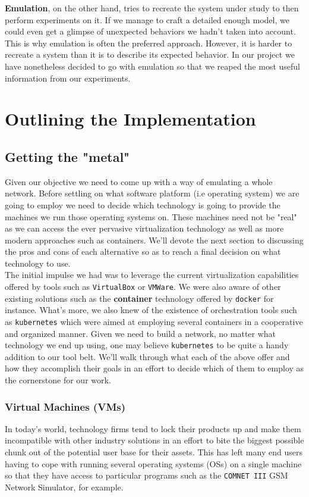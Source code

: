             \textbf{Emulation}, on the other hand, tries to recreate the system under study to then perform experiments on it. If we manage to craft a detailed enough model, we could even get a glimpse of unexpected behaviors we hadn't taken into account. This is why emulation is often the preferred approach. However, it is harder to recreate a system than it is to describe its expected behavior. In our project we have nonetheless decided to go with emulation so that we reaped the most useful information from our experiments.\\

    \section{Outlining the Implementation}
        \subsection{Getting the "metal"}
            Given our objective we need to come up with a way of emulating a whole network. Before settling on what software platform (i.e operating system) we are going to employ we need to decide which technology is going to provide the machines we run those operating systems on. These machines need not be "real" as we can access the ever pervasive virtualization technology as well as more modern approaches such as containers. We'll devote the next section to discussing the pros and cons of each alternative so as to reach a final decision on what technology to use.\\

            The initial impulse we had was to leverage the current virtualization capabilities offered by tools such as \texttt{VirtualBox} or \texttt{VMWare}. We were also aware of other existing solutions such as the \textbf{container} technology offered by \texttt{docker} for instance. What's more, we also knew of the existence of orchestration tools such as \texttt{kubernetes} which were aimed at employing several containers in a cooperative and organized manner. Given we need to build a network, no matter what technology we end up using, one may believe \texttt{kubernetes} to be quite a handy addition to our tool belt. We'll walk through what each of the above offer and how they accomplish their goals in an effort to decide which of them to employ as the cornerstone for our work.

            \subsubsection{Virtual Machines (VMs)}
                In today's world, technology firms tend to lock their products up and make them incompatible with other industry solutions in an effort to bite the biggest possible chunk out of the potential user base for their assets. This has left many end users having to cope with running several operating systems (OSs) on a single machine so that they have access to particular programs such as the \texttt{COMNET III} GSM Network Simulator, for example.\\

